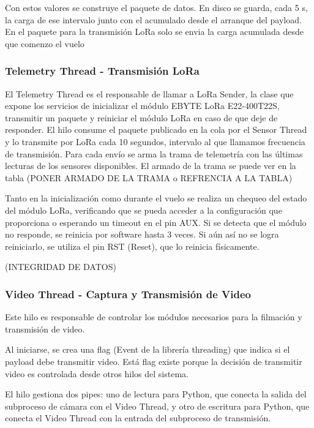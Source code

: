 \documentclass[12pt,a4paper]{article}
\begin{document}
Con estos valores se construye el paquete de datos. En disco se guarda, cada 5 s, la carga de ese intervalo junto con el acumulado desde el arranque del payload. En el paquete para la transmisión LoRa solo se envia la carga acumulada desde que comenzo el vuelo

\subsubsection{Telemetry Thread - Transmisión LoRa}\label{telemetry-thread---transmisiuxf3n-lora}

El Telemetry Thread es el responsable de llamar a LoRa Sender, la clase que expone los servicios de inicializar el módulo EBYTE LoRa E22-400T22S, transmitir un paquete y reiniciar el módulo LoRa en caso de que deje de responder. El hilo consume el paquete publicado en la cola por el Sensor Thread y lo transmite por LoRa cada 10 segundos, intervalo al que llamamos frecuencia de transmisión. Para cada envío se arma la trama de telemetría con las últimas lecturas de los sensores disponibles. El armado de la trama se puede ver en la tabla (PONER ARMADO DE LA TRAMA o REFRENCIA A LA TABLA)

Tanto en la inicialización como durante el vuelo se realiza un chequeo del estado del módulo LoRa, verificando que se pueda acceder a la configuración que proporciona o esperando un timeout en el pin AUX. Si se detecta que el módulo no responde, se reinicia por software hasta 3 veces. Si aún así no se logra reiniciarlo, se utiliza el pin RST (Reset), que lo reinicia físicamente.

(INTEGRIDAD DE DATOS)

\subsubsection{Video Thread - Captura y Transmisión de Video}\label{video-thread---captura-y-transmisiuxf3n-de-video}

Este hilo es responsable de controlar los módulos necesarios para la filmación y transmisión de video.

Al iniciarse, se crea una flag (Event de la librería threading) que indica si el payload debe transmitir video. Está flag existe porque la decisión de transmitir video es controlada desde otros hilos del sistema.

El hilo gestiona dos pipes: uno de lectura para Python, que conecta la salida del subproceso de cámara con el Video Thread, y otro de escritura para Python, que conecta el Video Thread con la entrada del subproceso de transmisión.
\end{document}
